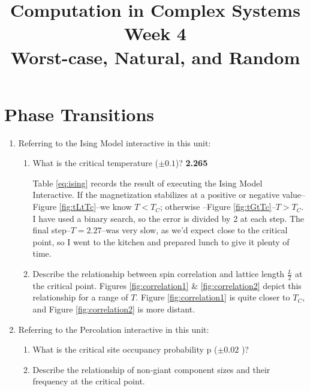 \documentclass[]{article}
\title{Computation in Complex Systems\\
	Week 4\\Worst-case, Natural, and Random
	}
\begin{document}
\maketitle

\section{Phase Transitions}

\begin{enumerate}
	\item Referring to the Ising Model interactive in this unit:
	\begin{enumerate}
		\item What is the critical temperature ($\pm0.1$)? \textbf{2.265}
		
		Table \ref{eq:ising} records the result of executing the Ising Model Interactive. If the magnetization stabilizes at a positive or negative value--Figure \ref{fig:tLtTc}--we know $T<T_C$; otherwise --Figure \ref{fig:tGtTc}--$T>T_C$. I have used a binary search, so the error is divided by 2 at each step. The final step--$T=2.27$--was very slow, as we'd expect close to the critical point, so I went to the kitchen and prepared lunch to give it plenty of time.
		\item  Describe the relationship between spin correlation and lattice length $\frac{L}{2}$ at the critical point. Figures \ref{fig:correlation1} \& \ref{fig:correlation2} depict this relationship for a range of $T$. Figure \ref{fig:correlation1} is quite closer to $T_C$, and Figure \ref{fig:correlation2} is more distant.
	\end{enumerate}
	
	\item 	Referring to the Percolation interactive in this unit:
	\begin{enumerate}
		\item What is the critical site occupancy probability p ($\pm0.02$ )?
		
		\item Describe the relationship of non-giant component sizes and their frequency at the critical point.
	\end{enumerate}
\end{enumerate}
\end{document}
